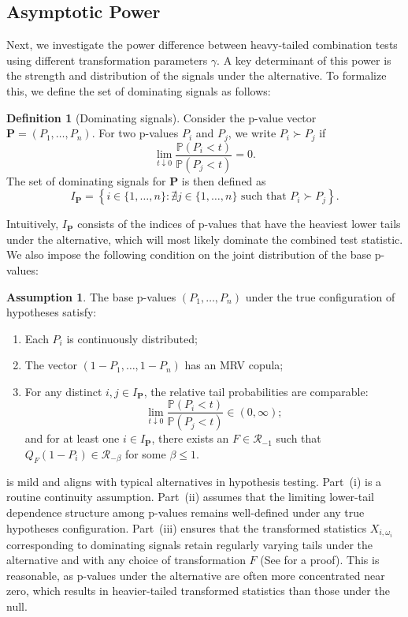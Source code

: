 \documentclass[12pt]{article}
\theoremstyle{plain}
\theoremstyle{plain}
\theoremstyle{definition}
\newtheorem{defn}{Definition}[section]
\newtheorem{assumption}{Assumption}
\renewcommand{\Pr}{\mathbb{P}}
\begin{document}
\subsection{Asymptotic Power}
\label{subsec:asymptotic-power}
Next, we investigate the power difference between heavy-tailed combination tests using different transformation parameters $\gamma$. A key determinant of this power is the strength and distribution of the signals under the alternative.
To formalize this, we define the set of dominating signals as follows:
\begin{defn}[Dominating signals]
Consider the p-value vector $\mathbf{P} = (P_1, \dots, P_n)$.  
For two p-values $P_i$ and $P_j$, we write $P_i \succ P_j$ if
\[
\lim_{t\downarrow0}\frac{\Pr(P_i < t)}{\Pr(P_j < t)}= 0.
\]
The set of dominating signals for $\mathbf{P}$ is then defined as
\begin{equation*}
I_{\mathbf P}=  \left\{i\in \{1,\dots, n\}: 
\nexists j \in \{1,\dots, n\}  \text{ such that } P_i \succ P_j\right\}.
\end{equation*}
\end{defn}
Intuitively, $I_{\mathbf P}$ consists of the indices of p-values that have the heaviest lower tails under the alternative, which will most likely dominate the combined test statistic. 
We also impose the following condition on the joint distribution of the base p-values:
\begin{assumption}
\label{asmp:p-alternative}
The base p-values $(P_1, \dots, P_n)$ under the true configuration of hypotheses satisfy:
\begin{enumerate}[label=(\roman*)]
    \item Each $P_i$ is continuously distributed;
    \item The vector $(1-P_1, \dots, 1-P_n)$ has an MRV copula;
    \item For any distinct $i,j\in I_{\mathbf{P}}$,  the relative tail probabilities are comparable: 
    \[\lim_{t\downarrow0}\frac{\Pr(P_i<t)}{\Pr(P_j< t)}\in(0,\infty);\]
    and for at least one $i\in I_{\mathbf{P}}$, there exists an $F\in\mathscr{R}_{-1}$ such that $Q_{F}(1-P_i)\in\mathscr{R}_{-\beta}$ for some $\beta\le1$. 
\end{enumerate}
\end{assumption}
 is mild and aligns with typical alternatives in hypothesis testing. Part~(i) is a routine continuity assumption. Part~(ii) assumes that the limiting lower-tail dependence structure among p-values remains well-defined under any true hypotheses configuration. Part~(iii) ensures that the transformed statistics $X_{i,\omega_i}$ corresponding to dominating signals retain regularly varying tails under the alternative and with any choice of transformation $F$ (See  for a proof). This is reasonable, as p-values under the alternative are often more concentrated near zero, which results in heavier-tailed transformed statistics than those under the null.
\end{document}
